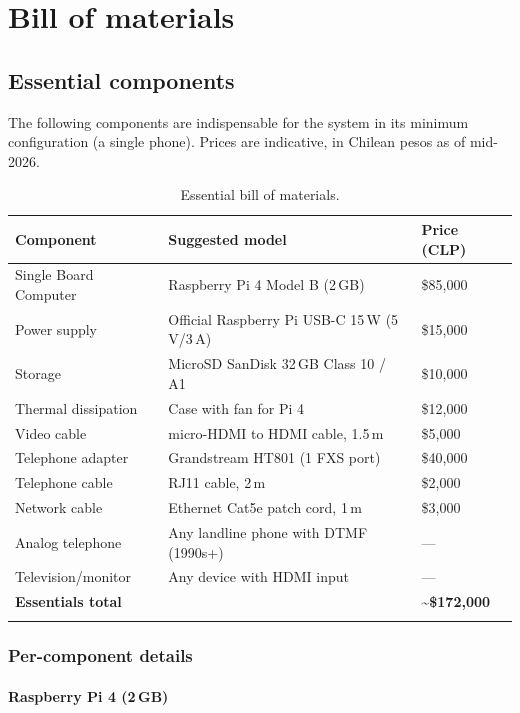 \chapter{Bill of materials}

\section{Essential components}

The following components are indispensable for the system in its minimum configuration (a single phone). Prices are indicative, in Chilean pesos as of mid-2026.

\begin{longtable}{p{} p{} R{0.18\textwidth}}
\toprule
\textbf{Component} & \textbf{Suggested model} & \textbf{Price (CLP)} \\
\midrule
\endhead
Single Board Computer & Raspberry Pi 4 Model B (2\,GB) & \$85,000 \\
Power supply & Official Raspberry Pi USB-C 15\,W (5\,V/3\,A) & \$15,000 \\
Storage & MicroSD SanDisk 32\,GB Class 10 / A1 & \$10,000 \\
Thermal dissipation & Case with fan for Pi 4 & \$12,000 \\
Video cable & micro-HDMI to HDMI cable, 1.5\,m & \$5,000 \\
Telephone adapter & Grandstream HT801 (1 FXS port) & \$40,000 \\
Telephone cable & RJ11 cable, 2\,m & \$2,000 \\
Network cable & Ethernet Cat5e patch cord, 1\,m & \$3,000 \\
Analog telephone & Any landline phone with DTMF (1990s+) & --- \\
Television/monitor & Any device with HDMI input & --- \\
\midrule
\textbf{Essentials total} & & \textbf{\textasciitilde\$172,000} \\
\bottomrule
\caption{Essential bill of materials.}\\
\end{longtable}

\subsection{Per-component details}

\subsubsection{Raspberry Pi 4 (2\,GB)}

